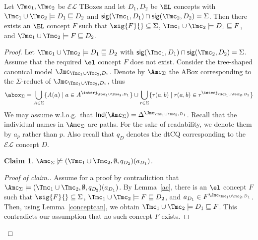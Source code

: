 \documentclass{lmcs}
\theoremstyle{definition}
\newtheorem*{claim*}{Claim}
\let\OriginalQedSymbol\qedsymbol
\renewcommand{\qedsymbol}{\OriginalQedSymbol\setcounter{claim}{0}}
\let\NormalQedSymbol\qedsymbol
\newenvironment{clmproof}[1]{\renewcommand{\qedsymbol}{$\dashv$}\begin{proof}[Proof of claim.]\space#1}{\end{proof}\renewcommand{\qedsymbol}{\NormalQedSymbol}}
\begin{document}
%
%
\begin{lem}[\EL Interpolation]\label{lem:interpolation}
  Let $\Tmc_{1},\Tmc_{2}$ be $\mathcal{EL}$ TBoxes and let 
  $D_{1},D_{2}$ be $\EL$ concepts with $\Tmc_{1}\cup \Tmc_{2} \models 
  D_{1} \sqsubseteq D_{2}$ and ${\sf sig}(\Tmc_{1},D_{1}) \cap {\sf 
  sig}(\Tmc_{2},D_{2})=
  \Sigma$. Then there exists an $\EL$ concept $F$ such that $\sig{F}{}\subseteq\Sigma$,
  $\Tmc_{1}\cup \Tmc_{2}\models D_{1} \sqsubseteq F$, and
  \mbox{$\Tmc_{1}\cup \Tmc_{2}\models F \sqsubseteq D_{2}$}.
\end{lem}
\begin{proof}
  Let $\Tmc_{1}\cup \Tmc_{2} \models D_{1} \sqsubseteq D_{2}$ with 
  ${\sf sig}(\Tmc_{1},D_{1}) \cap {\sf sig}(\Tmc_{2},D_{2})= \Sigma$. 
  Assume that the required $\el$ concept $F$ does not exist. Consider 
  the tree-shaped canonical model $\Jmc_{\Tmc_{1}\cup \Tmc_{2},D_{1}}$. 
  Denote by $\Amc_{\Sigma}$ the ABox corresponding to the 
  $\Sigma$-reduct of $\Jmc_{\Tmc_{1}\cup \Tmc_{2},D_{1}}$, thus
  \[\abox_{\Sigma}=\bigcup_{A\in\Sigma}\{A(a) \mid a\in 
  A^{\interj_{\tbox_{1}\cup\tbox_{2},D_{1}}}\}\cup \bigcup_{r\in \Sigma}\{r(a,b) \mid r(a,b)\in 
  r^{\interj_{\tbox_{1}\cup\tbox_{2},D_{1}}}\}
 \]
  We may assume w.l.o.g.~that ${\sf Ind}(\Amc_{\Sigma})= \Delta^{\Jmc_{\Tmc_{1}\cup \Tmc_{2},D_{1}}}$. Recall that
  the individual names in $\Amc_{\Sigma}$ are paths. For the sake of readability, we denote them by $a_{p}$
  rather than $p$. Also recall that $q_{D}$ denotes the dtCQ corresponding to the $\mathcal{EL}$ concept $D$.

  \begin{claim*}
    $\Amc_{\Sigma}\not\models (\Tmc_{1}\cup \Tmc_{2},\emptyset,q_{D_{2}})(a_{D_{1}})$.
  \end{claim*}
  \begin{clmproof}
    Assume for a proof by contradiction that $\Amc_{\Sigma}\models (\Tmc_{1}\cup 
    \Tmc_{2},\emptyset,q_{D_{2}})(a_{D_{1}})$.  
    By Lemma~\ref{ac}, there is an $\el$ concept $F$ such that 
    $\sig{F}{}\subseteq\Sigma$, $\Tmc_{1}\cup \Tmc_{2}\models F 
    \sqsubseteq D_{2}$, and $a_{D_1} \in F^{\Jmc_{\Tmc_{1}\cup \Tmc_{2},D_{1}}}$. Then, using Lemma~\ref{conceptcan}, we 
    obtain $\Tmc_{1}\cup \Tmc_{2}\models D_1 \sqsubseteq F$. This contradicts our assumption that no such concept $F$ exists.
  \end{clmproof}
    

\end{proof}
\end{document}
